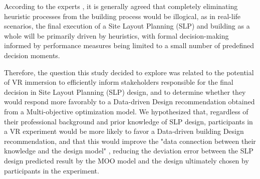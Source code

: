 According to the experts \cite{Augenbroe2012}, it is generally agreed that completely eliminating heuristic processes from the building process would be illogical, as in real-life scenarios, the final execution of a Site Layout Planning (SLP) and building as a whole will be primarily driven by heuristics, with formal decision-making informed by performance measures being limited to a small number of predefined decision moments.

Therefore, the question this study decided to explore was related to the potential of VR immersion to efficiently inform stakeholders responsible for the final decision in Site Layout Planning (SLP) design, and to determine whether they would respond more favorably to a Data-driven Design recommendation obtained from a Multi-objective optimization model. We hypothesized that, regardless of their professional background and prior knowledge of SLP design, participants in a VR experiment would be more likely to favor a Data-driven building Design recommendation, and that this would improve the "data connection between their knowledge and the design model" \cite{Augenbroe2012}, reducing the deviation error between the SLP design predicted result by the MOO model and the design ultimately chosen by participants in the experiment.

        

